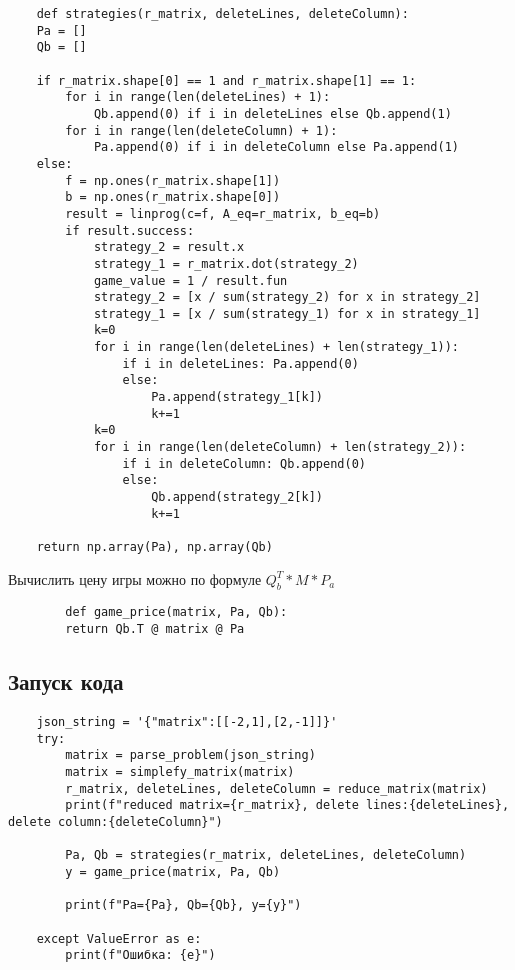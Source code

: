 \documentclass{article}
\begin{document}
\begin{listing}[H]
    \begin{verbatim}
    def strategies(r_matrix, deleteLines, deleteColumn):
    Pa = []
    Qb = []

    if r_matrix.shape[0] == 1 and r_matrix.shape[1] == 1:
        for i in range(len(deleteLines) + 1):
            Qb.append(0) if i in deleteLines else Qb.append(1)
        for i in range(len(deleteColumn) + 1):
            Pa.append(0) if i in deleteColumn else Pa.append(1)
    else:
        f = np.ones(r_matrix.shape[1])
        b = np.ones(r_matrix.shape[0])
        result = linprog(c=f, A_eq=r_matrix, b_eq=b)
        if result.success:
            strategy_2 = result.x
            strategy_1 = r_matrix.dot(strategy_2)
            game_value = 1 / result.fun
            strategy_2 = [x / sum(strategy_2) for x in strategy_2]
            strategy_1 = [x / sum(strategy_1) for x in strategy_1]
            k=0
            for i in range(len(deleteLines) + len(strategy_1)):
                if i in deleteLines: Pa.append(0)
                else:
                    Pa.append(strategy_1[k])
                    k+=1
            k=0
            for i in range(len(deleteColumn) + len(strategy_2)):
                if i in deleteColumn: Qb.append(0)
                else:
                    Qb.append(strategy_2[k])
                    k+=1

    return np.array(Pa), np.array(Qb)
    \end{verbatim}
\end{listing}

Вычислить цену игры можно по формуле $Q_b^T * M * P_a$

\begin{listing}[H]
    \begin{verbatim}
        def game_price(matrix, Pa, Qb):
        return Qb.T @ matrix @ Pa
    \end{verbatim}
\end{listing}

\subsection{Запуск кода}
\begin{listing}[H]
    \begin{verbatim}
    json_string = '{"matrix":[[-2,1],[2,-1]]}'
    try:
        matrix = parse_problem(json_string)
        matrix = simplefy_matrix(matrix)
        r_matrix, deleteLines, deleteColumn = reduce_matrix(matrix)
        print(f"reduced matrix={r_matrix}, delete lines:{deleteLines}, delete column:{deleteColumn}")

        Pa, Qb = strategies(r_matrix, deleteLines, deleteColumn)
        y = game_price(matrix, Pa, Qb)

        print(f"Pa={Pa}, Qb={Qb}, y={y}")
        
    except ValueError as e:
        print(f"Ошибка: {e}")
    \end{verbatim}
\end{listing}
\end{document}
